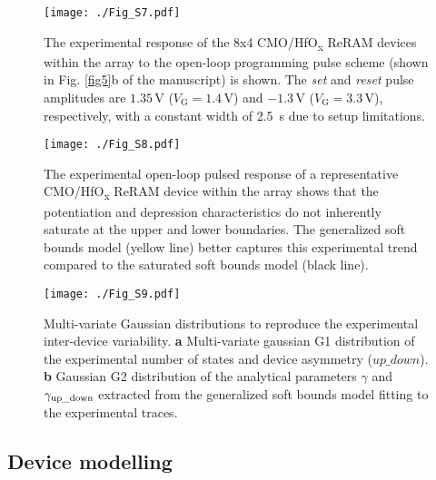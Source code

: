 \begin{figure}[H]
\centering
\texttt{[image: ./Fig\_S7.pdf]}
\caption{The experimental response of the 8x4 CMO/HfO\textsubscript{\textnormal{x}} ReRAM devices within the array to the open-loop programming pulse scheme (shown in Fig. \ref{fig5}b of the manuscript) is shown. The \textit{set} and \textit{reset} pulse amplitudes are \(1.35 \,\mathrm{V}\) (\(V_\mathrm{G} = \mathrm{1.4 \, V}\)) and \(-1.3 \,\mathrm{V}\) (\(V_\mathrm{G} = \mathrm{3.3 \, V}\)), respectively, with a constant width of 2.5~\textmu s due to setup limitations.}
\label{figS7}
\end{figure}

\begin{figure}[H]
\centering
\texttt{[image: ./Fig\_S8.pdf]}
\caption{The experimental open-loop pulsed response of a representative CMO/HfO\textsubscript{\textnormal{x}} ReRAM device within the array shows that the potentiation and depression characteristics do not inherently saturate at the upper and lower boundaries. The generalized soft bounds model (yellow line) better captures this experimental trend compared to the saturated soft bounds model (black line).}
\label{figS8}
\end{figure}

\begin{figure}[H]
\centering
\texttt{[image: ./Fig\_S9.pdf]}
\caption{
Multi-variate Gaussian distributions to reproduce the experimental inter-device variability. \textbf{a} Multi-variate gaussian G1 distribution of the experimental number of states and device asymmetry ($up\_down$). \textbf{b} Gaussian G2 distribution of the analytical parameters $\gamma$ and $\gamma_{\rm up\_down}$ extracted from the generalized soft bounds model fitting to the experimental traces.}
\label{figS9}
\end{figure}

\subsection*{Device modelling}
